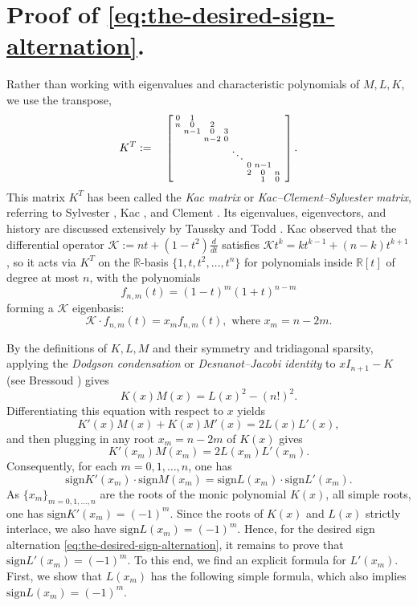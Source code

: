 \documentclass[10pt]{amsart}
\theoremstyle{plain}
\newcommand{\RR}{\mathbb{R}}
\newcommand{\sign}{\mathrm{sign}}
\begin{document}
\section{Proof of \eqref{eq:the-desired-sign-alternation}.}
\label{sec:ChatGPT-proof}
Rather than working with
eigenvalues and characteristic polynomials of $M,L,K$, we use the transpose,
\begin{equation}
\label{eq:Kac-matrix}
K^T:=\quad
\left[\begin{smallmatrix}
 0 & 1 &    &       &       &  &    & \cr
 n & 0 & 2&       &       &   &   & \cr
  & n-1 &  0 &3    &       &    &  & \cr
   &   & n-2  &0      & &     & & \cr
    &   &    & &\ddots      &  & \cr
 &   &    & & &0  &n-1    &  & \cr
&   &    &   &    &2    &0     & n\cr 
&    &    &   &    &       & 1    & 0 
\end{smallmatrix}\right].
\end{equation}
This matrix $K^T$ has been called the {\it Kac matrix} or {\it Kac--Clement--Sylvester matrix}, referring to Sylvester \cite{Sylvester}, Kac \cite{Kac}, and Clement \cite{Clement}.  Its eigenvalues, eigenvectors, and history are discussed extensively by Taussky and Todd \cite{TausskyTodd}.  
Kac observed that the differential operator  
$
\mathcal{K}:=
nt+(1-t^2)\frac{d}{dt}
$
satisfies $\mathcal{K} t^k = k t^{k-1}+(n-k)t^{k+1}$, so it
acts via $K^T$ on the $\RR$-basis $\{1,t,t^2,\ldots,t^n\}$ for
polynomials inside $\RR[t]$ of degree at most $n$, with the polynomials
\begin{equation}
\label{eq:Kac-polynomials}
f_{n,m}(t)=(1-t)^m (1+t)^{n-m}
\end{equation}
forming
a $\mathcal{K}$ eigenbasis:
\begin{equation}
\label{eq:Kac-eigenfunction-equation}
\mathcal{K} \cdot f_{n,m}(t)= x_m f_{n,m}(t),
\text{ where }x_{m}=n-2m.
\end{equation}

By the definitions of $K,L,M$ and their symmetry
and tridiagonal sparsity, applying the {\it Dodgson condensation} or {\it Desnanot--Jacobi identity}
to $x I_{n+1}-K$ (see Bressoud \cite[\S 3.5]{Bressoud}) gives
$$
K(x) M(x) = L(x)^2 - (n!)^2.
$$
Differentiating this equation with respect to $x$ yields
$$
K'(x) M(x) + K(x) M'(x) = 2 L(x) L'(x),
$$
and then plugging in any root $x_m=n-2m$ 
of $K(x)$ gives
$$
K'(x_m) M(x_m) = 2L(x_m) L'(x_m).
$$
Consequently, for each $m=0,1,\ldots, n$, one has
\begin{equation}
\label{eq:sign-relations}
 \sign K'(x_m) \cdot \sign M(x_m) =\sign L(x_m) \cdot \sign L'(x_m).
\end{equation}
As $\{x_m\}_{m=0,1,\ldots,n}$ are the roots of the monic polynomial
$K(x)$, all simple roots, one has $\sign K'(x_m)=(-1)^m$. Since the
roots of \( K(x) \) and \( L(x) \) strictly interlace, we also have
\( \sign L(x_m)=(-1)^m \). Hence, for the desired sign alternation
\eqref{eq:the-desired-sign-alternation}, it remains to prove that
\( \sign L'(x_m)=(-1)^m \). To this end, we find an explicit formula
for \( L'(x_m) \). First, we show that \( L(x_m) \) has the following
simple formula, which also implies \( \sign L(x_m)=(-1)^m \).
\end{document}
